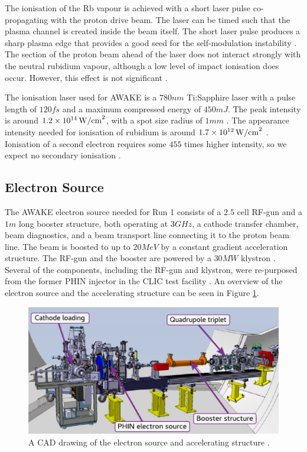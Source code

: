 The ionisation of the Rb vapour is achieved with a short laser pulse co-propagating with the proton drive beam. The laser can be timed such that the plasma channel is created inside the beam itself. The short laser pulse produces a sharp plasma edge that provides a good seed for the self-modulation instability \cite{vieira:2014a}. The section of the proton beam ahead of the laser does not interact strongly with the neutral rubidium vapour, although a low level of impact ionisation does occur. However, this effect is not significant \cite{awake_collaboration:2017}.

The ionisation laser used for AWAKE is a $780\unit{nm}$ Ti:Sapphire laser with a pulse length of $120\unit{fs}$ and a maximum compressed energy of $450\unit{mJ}$. The peak intensity is around $1.2\times 10^{14}\,\mathrm{W/cm}^{2}$, with a spot size radius of $1\unit{mm}$ \cite{awake_collaboration:2017}. The appearance intensity needed for ionisation of rubidium is around $1.7\times 10^{12}\,\mathrm{W/cm}^{2}$ \cite{augst:1989}. Ionisation of a second electron requires some $455$ times higher intensity, so we expect no secondary ionisation \cite{muggli:2018}.

\subsection{Electron Source}
\label{WFA:Design:ESource}

The AWAKE electron source needed for Run 1 consists of a $2.5$ cell RF-gun and a $1\unit{m}$ long booster structure, both operating at $3\unit{GHz}$, a cathode transfer chamber, beam diagnostics, and a beam transport line connecting it to the proton beam line. The beam is boosted to up to $20\unit{MeV}$ by a constant gradient acceleration structure. The RF-gun and the booster are powered by a $30\unit{MW}$ klystron \cite{awake_collaboration:2017,pepitone:2016}. Several of the components, including the RF-gun and klystron, were re-purposed from the former PHIN injector in the CLIC test facility \cite{chevallay:2012}. An overview of the electron source and the accelerating structure can be seen in Figure \ref{Fig:WFA:ESource}.

\begin{figure}[hbt]
    \centering
    \includegraphics[width=0.70\linewidth,trim={0mm 0mm 0mm 0mm},clip]{figures/ElectronSource}
    \caption{\label{Fig:WFA:ESource} A CAD drawing of the electron source and accelerating structure \cite{pepitone:2016}.}
\end{figure}

